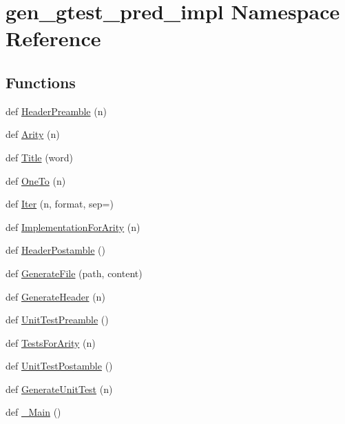 \hypertarget{namespacegen__gtest__pred__impl}{}\section{gen\+\_\+gtest\+\_\+pred\+\_\+impl Namespace Reference}
\label{namespacegen__gtest__pred__impl}
\subsection*{Functions}
\begin{DoxyCompactItemize}
\item 
def \hyperlink{namespacegen__gtest__pred__impl_a0b99cadcffab4bf161654a382163bac8}{Header\+Preamble} (n)
\item 
def \hyperlink{namespacegen__gtest__pred__impl_a5bbb7272f3588b969ab3ded6f49836a1}{Arity} (n)
\item 
def \hyperlink{namespacegen__gtest__pred__impl_ae49dd9bd9152dbcb3ca7994ce04c37ba}{Title} (word)
\item 
def \hyperlink{namespacegen__gtest__pred__impl_a7920598d51c9dded76a4ef9ffde339e4}{One\+To} (n)
\item 
def \hyperlink{namespacegen__gtest__pred__impl_ac016218b7c9437d1d5ac85c574c83069}{Iter} (n, format, sep=\textquotesingle{}\textquotesingle{})
\item 
def \hyperlink{namespacegen__gtest__pred__impl_a8c53b141b89f9c05d0131d9756dfeab0}{Implementation\+For\+Arity} (n)
\item 
def \hyperlink{namespacegen__gtest__pred__impl_a3d40c7ef70cf4d46e56c9612f34027bf}{Header\+Postamble} ()
\item 
def \hyperlink{namespacegen__gtest__pred__impl_a16210fe365dfd176e04aa2578ac5a8d9}{Generate\+File} (path, content)
\item 
def \hyperlink{namespacegen__gtest__pred__impl_a6f3039a82a5283846fb272f8a3af6743}{Generate\+Header} (n)
\item 
def \hyperlink{namespacegen__gtest__pred__impl_ae52dc86461d1b666c7b658a8c27c69f9}{Unit\+Test\+Preamble} ()
\item 
def \hyperlink{namespacegen__gtest__pred__impl_ab0da913fa15e5695d5bb2dd1de5dec57}{Tests\+For\+Arity} (n)
\item 
def \hyperlink{namespacegen__gtest__pred__impl_a57b922f50d0807896496dcd883c1f098}{Unit\+Test\+Postamble} ()
\item 
def \hyperlink{namespacegen__gtest__pred__impl_acbd42b5b7fb7ddbb06a4dd58fc37e9ed}{Generate\+Unit\+Test} (n)
\item 
def \hyperlink{namespacegen__gtest__pred__impl_a50dd74615a1507ce657c8fa24d7c161e}{\+\_\+\+Main} ()
\end{DoxyCompactItemize}

